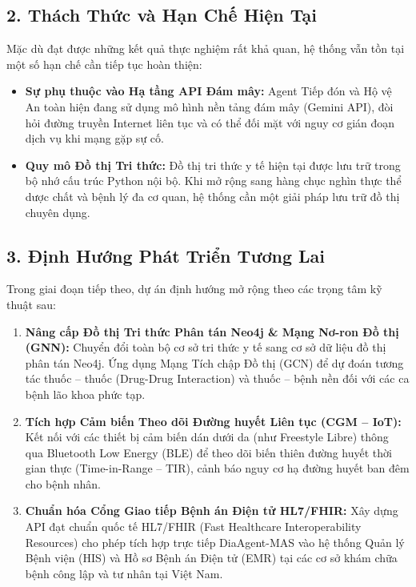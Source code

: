 \documentclass[12pt,a4paper]{article}
\begin{document}
\subsection*{2. Thách Thức và Hạn Chế Hiện Tại}
Mặc dù đạt được những kết quả thực nghiệm rất khả quan, hệ thống vẫn tồn tại một số hạn chế cần tiếp tục hoàn thiện:
\begin{itemize}[leftmargin=1.2cm]
    \item \textbf{Sự phụ thuộc vào Hạ tầng API Đám mây:} Agent Tiếp đón và Hộ vệ An toàn hiện đang sử dụng mô hình nền tảng đám mây (Gemini API), đòi hỏi đường truyền Internet liên tục và có thể đối mặt với nguy cơ gián đoạn dịch vụ khi mạng gặp sự cố.
    \item \textbf{Quy mô Đồ thị Tri thức:} Đồ thị tri thức y tế hiện tại được lưu trữ trong bộ nhớ cấu trúc Python nội bộ. Khi mở rộng sang hàng chục nghìn thực thể dược chất và bệnh lý đa cơ quan, hệ thống cần một giải pháp lưu trữ đồ thị chuyên dụng.
\end{itemize}

\subsection*{3. Định Hướng Phát Triển Tương Lai}
Trong giai đoạn tiếp theo, dự án định hướng mở rộng theo các trọng tâm kỹ thuật sau:
\begin{enumerate}[leftmargin=1.2cm]
    \item \textbf{Nâng cấp Đồ thị Tri thức Phân tán Neo4j \& Mạng Nơ-ron Đồ thị (GNN):} Chuyển đổi toàn bộ cơ sở tri thức y tế sang cơ sở dữ liệu đồ thị phân tán Neo4j. Ứng dụng Mạng Tích chập Đồ thị (GCN) để dự đoán tương tác thuốc -- thuốc (Drug-Drug Interaction) và thuốc -- bệnh nền đối với các ca bệnh lão khoa phức tạp.
    \item \textbf{Tích hợp Cảm biến Theo dõi Đường huyết Liên tục (CGM -- IoT):} Kết nối với các thiết bị cảm biến dán dưới da (như Freestyle Libre) thông qua Bluetooth Low Energy (BLE) để theo dõi biến thiên đường huyết thời gian thực (Time-in-Range -- TIR), cảnh báo nguy cơ hạ đường huyết ban đêm cho bệnh nhân.
    \item \textbf{Chuẩn hóa Cổng Giao tiếp Bệnh án Điện tử HL7/FHIR:} Xây dựng API đạt chuẩn quốc tế HL7/FHIR (Fast Healthcare Interoperability Resources) cho phép tích hợp trực tiếp DiaAgent-MAS vào hệ thống Quản lý Bệnh viện (HIS) và Hồ sơ Bệnh án Điện tử (EMR) tại các cơ sở khám chữa bệnh công lập và tư nhân tại Việt Nam.
\end{enumerate}
\end{document}
